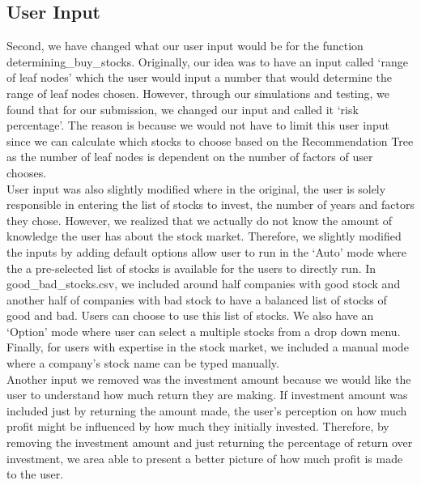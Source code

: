 \documentclass[fontsize=11pt]{article}
\begin{document}
\subsection{User Input}
Second, we have changed what our user input would be for the function determining\_buy\_stocks. Originally, our idea was to have an input called `range of leaf nodes' which the user would input a number that would determine the range of leaf nodes chosen. However, through our simulations and testing, we found that for our submission, we changed our input and called it `risk percentage'. The reason is because we would not have to limit this user input since we can calculate which stocks to choose based on the Recommendation Tree as the number of leaf nodes is dependent on the number of factors of user chooses. \\

User input was also slightly modified where in the original, the user is solely responsible in entering the list of stocks to invest, the number of years and factors they chose. However, we realized that we actually do not know the amount of knowledge the user has about the stock market. Therefore, we slightly modified the inputs by adding default options allow user to run in the `Auto' mode where the a pre-selected list of stocks is available for the users to directly run. In good\_bad\_stocks.csv, we included around half companies with good stock and another half of companies with bad stock to have a balanced list of stocks of good and bad. Users can choose to use this list of stocks. We also have an `Option' mode where user can select a multiple stocks from a drop down menu. Finally, for users with expertise in the stock market, we included a manual mode where a company's stock name can be typed manually. \\

Another input we removed was the investment amount because we would like the user to understand how much return they are making. If investment amount was included just by returning the amount made, the user's perception on how much profit might be influenced by how much they initially invested. Therefore, by removing the investment amount and just returning the percentage of return over investment, we area able to present a better picture of how much profit is made to the user.
\end{document}
